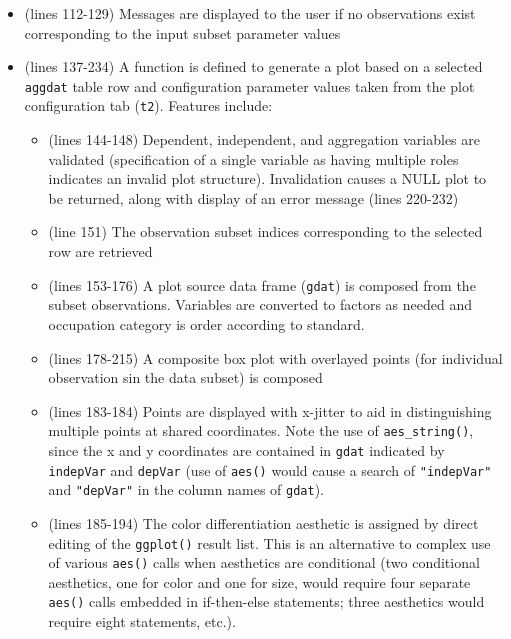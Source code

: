 \documentclass[10pt, letterpaper]{article}
\begin{document}
\begin{spacing}{1.0}
\begin{itemize}
\begin{itemize}
\begin{itemize}
              \item Automatic column width assignment (based on max width of contained data)
              \item The order of the second column is set to ascending (note that col IDs are 0-based)
          \end{itemize}
      \item (lines 112-129) Messages are displayed to the user if no observations exist corresponding to the input subset parameter values
        \item (lines 137-234) A function is defined to generate a plot based on a selected \texttt{aggdat} table row and configuration parameter values taken from the plot configuration tab (\texttt{t2}).  Features include:
          \begin{itemize}
              \item (lines 144-148) Dependent, independent, and aggregation variables are validated (specification of a single variable as having multiple roles indicates an invalid plot structure).  Invalidation causes a NULL plot to be returned, along with display of an error message (lines 220-232)
              \item (line 151) The observation subset indices corresponding to the selected row are retrieved
              \item (lines 153-176) A plot source data frame (\texttt{gdat}) is composed from the subset observations.  Variables are converted to factors as needed and occupation category is order according to standard.
              \item (lines 178-215) A composite box plot with overlayed points (for individual observation sin the data subset) is composed
              \item (lines 183-184) Points are displayed with x-jitter to aid in distinguishing multiple points at shared coordinates.  Note the use of \texttt{aes\_string()}, since the x and y coordinates are contained in \texttt{gdat} indicated by \texttt{indepVar} and \texttt{depVar} (use of \texttt{aes()} would cause a search of \texttt{"indepVar"} and \texttt{"depVar"} in the column names of \texttt{gdat}).
              \item (lines 185-194) The color differentiation aesthetic is assigned by direct editing of the \texttt{ggplot()} result list.  This is an alternative to complex use of various \texttt{aes()} calls when aesthetics are conditional (two conditional aesthetics, one for color and one for size, would require four separate \texttt{aes()} calls embedded in if-then-else statements; three aesthetics would require eight statements, etc.).

\end{itemize}
\end{itemize}
\end{itemize}
\end{spacing}
\end{document}

